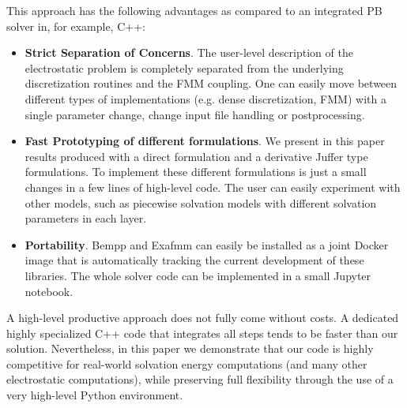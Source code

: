This approach has the following advantages as compared to an integrated PB solver in, for example, C++:
\begin{itemize}
	\item \textbf{Strict Separation of Concerns}. The user-level description of the electrostatic problem is completely separated from the underlying discretization routines and the FMM coupling. One can easily move between different types of implementations (e.g. dense discretization, FMM) with a single parameter change, change input file handling or postprocessing.
	\item \textbf{Fast Prototyping of different formulations}. We present in this paper results produced with a direct formulation and a derivative Juffer type formulations. To implement these different formulations is just a small changes in a few lines of high-level code. The user can easily experiment with other models, such as piecewise solvation models with different solvation parameters in each layer.
	\item \textbf{Portability}. Bempp and Exafmm can easily be installed as a joint Docker image that is automatically tracking the current development of these libraries. The whole solver code can be implemented in a small Jupyter notebook.
\end{itemize}
A high-level productive approach does not fully come without costs. A dedicated highly specialized C++ code that integrates all steps tends to be faster than our solution. Nevertheless, in this paper we demonstrate that our code is highly competitive for real-world solvation energy computations (and many other electrostatic computations), while preserving full flexibility through the use of a very high-level Python environment.



